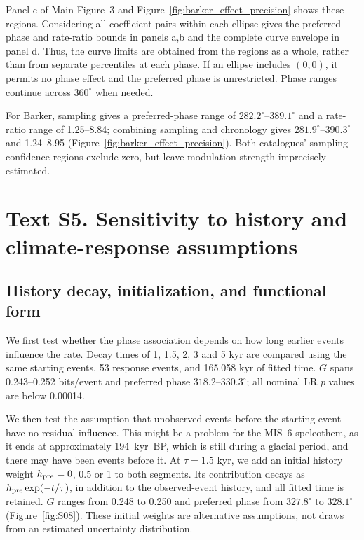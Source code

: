 \documentclass[11pt]{article}
\begin{document}
Panel c of Main Figure~3 and Figure~\ref{fig:barker_effect_precision} shows these regions. Considering all coefficient pairs within each ellipse gives the preferred-phase and rate-ratio bounds in panels a,b and the complete curve envelope in panel d. Thus, the curve limits are obtained from the regions as a whole, rather than from separate percentiles at each phase. If an ellipse includes $(0,0)$, it permits no phase effect and the preferred phase is unrestricted. Phase ranges continue across $360^\circ$ when needed.

For Barker, sampling gives a preferred-phase range of $282.2^\circ$--$389.1^\circ$ and a rate-ratio range of 1.25--8.84; combining sampling and chronology gives $281.9^\circ$--$390.3^\circ$ and 1.24--8.95 (Figure~\ref{fig:barker_effect_precision}). Both catalogues' sampling confidence regions exclude zero, but leave modulation strength imprecisely estimated.

\section*{Text S5. Sensitivity to history and climate-response assumptions}

\subsection*{History decay, initialization, and functional form}

We first test whether the phase association depends on how long earlier events influence the rate. Decay times of 1, 1.5, 2, 3 and 5 kyr are compared using the same starting events, 53 response events, and 165.058 kyr of fitted time. $G$ spans 0.243--0.252 bits/event and preferred phase $318.2$--$330.3^\circ$; all nominal LR $p$ values are below 0.00014. 

We then test the assumption that unobserved events before the starting event have no residual influence. This might be a problem for the MIS~6 speleothem, as it ends at approximately 194~kyr~BP, which is still during a glacial period, and there may have been events before it. At $\tau=1.5$ kyr, we add an initial history weight $h_{\rm pre}=0$, 0.5 or 1 to both segments. Its contribution decays as $h_{\rm pre}\exp(-t/\tau)$, in addition to the observed-event history, and all fitted time is retained. $G$ ranges from 0.248 to 0.250 and preferred phase from $327.8^\circ$ to $328.1^\circ$ (Figure~\ref{fig:S08}). These initial weights are alternative assumptions, not draws from an estimated uncertainty distribution.
\end{document}
